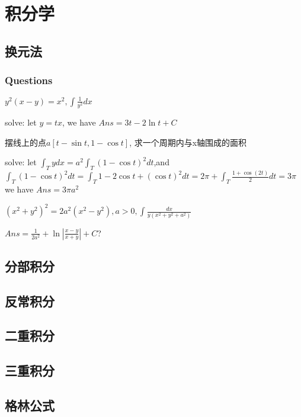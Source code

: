 \documentclass[UTF8]{../../09-Mathematics}
\begin{document}
\chapter{积分学}

\section{换元法}

\subsection{Questions}

\begin{question}
    $y^2(x-y) = x^2, \int \frac{1}{y^2}dx$

    solve: let $y = tx$, we have $Ans = 3t-2\ln t + C $
\end{question} 

\begin{question}
    摆线上的点$a[t- \sin t, 1- \cos t]$, 求一个周期内与x轴围成的面积

    solve: let $\int _T y dx = a^2 \int _T (1- \cos t)^2 dt$,and $\int _T (1- \cos t)^2 dt = \int _T 1- 2 \cos t + (\cos t)^2 dt = 2 \pi + \int _T \frac{1 + \cos (2t)}{2}dt = 3 \pi$ we have $Ans = 3\pi a^2 $
\end{question} 

\begin{question}
    $(x^2 + y^2)^2 = 2a^2(x^2-y^2), a>0, \int \frac{dx}{y(x^2 + y^2+ a^2)}$

    $Ans = \frac{1}{2a^2} + \ln |\frac{x-y}{x+y}| + C $?
\end{question} 


\section{分部积分}
\section{反常积分}

\section{二重积分}
\section{三重积分}

\section{格林公式}
\end{document}
